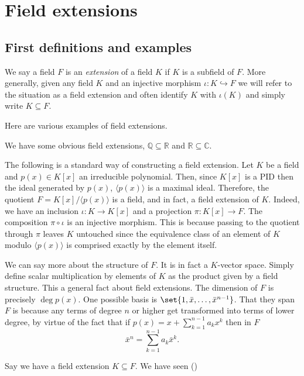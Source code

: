 \documentclass[12pt,oneside]{book}
\numberwithin{table}{section}
\numberwithin{equation}{section}
\numberwithin{figure}{section}
\newcommand{\R}{\mathbb{R}}
\newcommand{\C}{\mathbb{C}}
\newcommand{\Q}{\mathbb{Q}}
\newcommand{\gen}[1]{\langle #1 \rangle}
\begin{document}
\begin{example}
\begin{points}
	\end{points}
\end{example}

\chapter{Field extensions}

\section{First definitions and examples}
\begin{definition}
	We say a field \( F \) is an \emph{extension} of a field \( K \) if \( K \) is a subfield of \( F \). More generally, given any field \( K \) and an injective morphism \( \iota \colon K \hookrightarrow F \) we will refer to the situation as a field extension and often identify \( K \) with \( \iota(K) \) and simply write \( K \subseteq F \). 
\end{definition}

\begin{example}
Here are various examples of field extensions.
\begin{points}
	\item We have some obvious field extensions, \( \Q \subseteq \R \) and \( \R \subseteq \C \). 
	\item The following is a standard way of constructing a field extension. Let \( K \) be a field and \( p(x) \in K[x] \) an irreducible polynomial. Then, since \( K[x] \) is a PID then the ideal generated by \( p(x) \), \( \gen{p(x)} \) is a maximal ideal. Therefore, the quotient \( F = K[x]/\gen{p(x)} \) is a field, and in fact, a field extension of \( K \). Indeed, we have an inclusion \( \iota \colon K \to K[x] \) and a projection \( \pi \colon K[x] \to F \). The composition \( \pi \circ \iota \) is an injective morphism. This is because passing to the quotient through \( \pi \) leaves \( K \) untouched since the equivalence class of an element of \( K \) modulo \( \gen{p(x)} \) is comprised exactly by the element itself.   

		We can say more about the structure of \( F \). It is in fact a \( K \)-vector space. Simply define scalar multiplication by elements of \( K \) as the product given by a field structure. This a general fact about field extensions. The dimension of \( F \) is precisely \( \deg{p(x)} \). One possible basis is \( \set{1, \bar{x}, \dots, \bar{x}^{n-1}} \). That they span \( F \) is because any terms of degree \( n \) or higher get transformed into terms of lower degree, by virtue of the fact that if \( p(x) = x + \sum_{k = 1}^{n-1}a_k x^k  \) then in \( F \)
		\begin{equation*}
			\bar{x}^n = \sum_{k = 1}^{n-1}a_k \bar{x}^k. 
		\end{equation*}

	\item Say we have a field extension \( K \subseteq F \). We have seen ()  

	\end{points}
\end{example}
\end{document}
